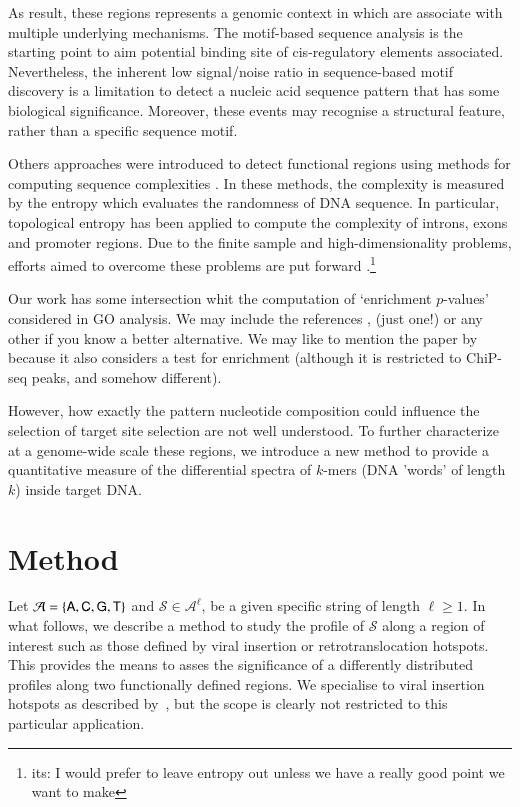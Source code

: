 \documentclass{bioinfo}
\begin{document}
As result, these regions represents a genomic context in which are associate with multiple underlying mechanisms. The motif-based sequence analysis is the starting point to aim potential binding site of cis-regulatory elements associated. Nevertheless, the inherent low signal/noise ratio in sequence-based motif discovery is a limitation to detect a nucleic acid sequence pattern that has some biological significance. Moreover, these events may recognise a structural feature, rather than a specific sequence motif.

Others approaches were introduced to detect functional regions using methods for computing sequence complexities \cite{pmid24533097,pmid21317142}. In these methods, the complexity is measured by the entropy which evaluates the randomness of DNA sequence. In particular, topological entropy has been applied to compute the complexity of introns, exons and promoter regions. Due to the finite sample and high-dimensionality problems, efforts aimed to overcome these problems are put forward \cite{pmid21317142}.\footnote{its: I would prefer to leave entropy out unless we have a really good point we want to make}


Our work has some intersection whit the computation of `enrichment $p$-values' considered in  GO analysis. We may include the references \cite{HSL}, \cite{RPTP} (just one!) or any other if you know a better alternative. We may like to mention the paper by \cite{BM} because it also considers a test for enrichment (although it is restricted to ChiP-seq peaks, and somehow different).

However, how exactly the pattern nucleotide composition could influence the selection of target site selection are not well understood. To further characterize at a genome-wide scale these regions, we introduce a new method to provide a quantitative measure of the differential spectra of $k$-mers (DNA 'words' of length $k$) inside target DNA.


\section{Method}
Let $\mathcal A = \{\sf A, C, G, T\}$ and $\mathcal S \in \mathcal A^\ell$, be a given specific string of length $\ell\geq 1$. %
In what follows, we describe a method to study the profile of $\mathcal S$ along a region of interest such as those defined by viral insertion or retrotranslocation hotspots. This provides the means to asses the significance of a differently distributed profiles along two functionally defined regions. We specialise to viral insertion hotspots as described by~\cite{IRAMM}, but the scope is clearly not restricted to this particular application. 
\end{document}
